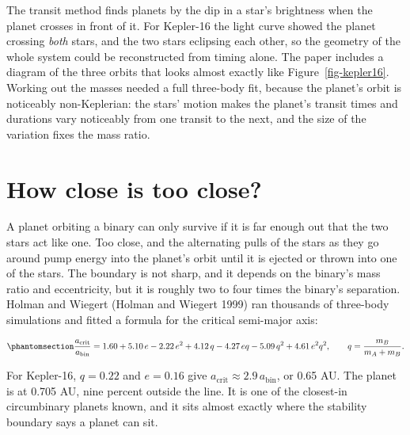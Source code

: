 \documentclass[
  10.5pt,
  letterpaper,
]{scrbook}
\theoremstyle{definition}
\theoremstyle{plain}
\theoremstyle{remark}
\begin{document}
\begin{tcolorbox}[enhanced jigsaw, arc=.35mm, bottomrule=.15mm, bottomtitle=1mm, breakable, colback=white, colbacktitle=quarto-callout-note-color!10!white, colframe=quarto-callout-note-color-frame, coltitle=black, left=2mm, leftrule=.75mm, opacityback=0, opacitybacktitle=0.6, rightrule=.15mm, title={Where it comes from}, titlerule=0mm, toprule=.15mm, toptitle=1mm]

The transit method finds planets by the dip in a star's brightness when
the planet crosses in front of it. For Kepler-16 the light curve showed
the planet crossing \emph{both} stars, and the two stars eclipsing each
other, so the geometry of the whole system could be reconstructed from
timing alone. The paper includes a diagram of the three orbits that
looks almost exactly like Figure~\ref{fig-kepler16}. Working out the
masses needed a full three-body fit, because the planet's orbit is
noticeably non-Keplerian: the stars' motion makes the planet's transit
times and durations vary noticeably from one transit to the next, and
the size of the variation fixes the mass ratio.

\end{tcolorbox}

\section{How close is too close?}\label{how-close-is-too-close}

A planet orbiting a binary can only survive if it is far enough out that
the two stars act like one. Too close, and the alternating pulls of the
stars as they go around pump energy into the planet's orbit until it is
ejected or thrown into one of the stars. The boundary is not sharp, and
it depends on the binary's mass ratio and eccentricity, but it is
roughly two to four times the binary's separation. Holman and Wiegert
(Holman and Wiegert 1999) ran thousands of three-body simulations and
fitted a formula for the critical semi-major axis:

\begin{equation}\protect\phantomsection\label{eq-holman-wiegert}{
\frac{a_{\mathrm{crit}}}{a_{\mathrm{bin}}} = 1.60 + 5.10\,e - 2.22\,e^2 + 4.12\,q - 4.27\,e q - 5.09\,q^2 + 4.61\,e^2 q^2,
\qquad q = \frac{m_B}{m_A + m_B}.
}\end{equation}

For Kepler-16, \(q = 0.22\) and \(e = 0.16\) give
\(a_{\mathrm{crit}} \approx 2.9\,a_{\mathrm{bin}}\), or 0.65 AU. The
planet is at 0.705 AU, nine percent outside the line. It is one of the
closest-in circumbinary planets known, and it sits almost exactly where
the stability boundary says a planet can sit.
\end{document}
